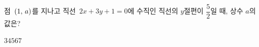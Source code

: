 점~$(1,\mkern3mu a)$를 지나고 직선~$2x+3y+1=0$에 수직인 직선의 $y$절편이 $\dfrac{5}{2}$일 때, 상수 $a$의 값은?
\begin{choices32}{$3$}{$4$}{$5$}{$6$}{$7$}\end{choices32}
